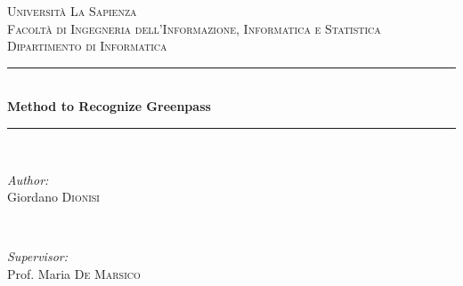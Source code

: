 \documentclass[12pt]{article}
\begin{document}
\begin{titlepage}

\newcommand{\HRule}{\rule{\linewidth}{0.5mm}} %

\center %
 

\textsc{\LARGE Università La Sapienza}\\[1.5cm] %
\textsc{\Large Facoltà di Ingegneria dell’Informazione, Informatica e Statistica}\\[0.5cm] %
\textsc{\large Dipartimento di Informatica}\\[0.5cm] %


\HRule \\[0.4cm]
{ \huge \bfseries Method to Recognize Greenpass}\\[0.4cm] %
\HRule \\[1.5cm]
 

\begin{minipage}{0.4\textwidth}
\begin{flushleft} \large
\emph{Author:}\\
Giordano \textsc{Dionisi}

\end{flushleft}
\end{minipage}
~
\begin{minipage}{0.4\textwidth}
\begin{flushright} \large
\emph{Supervisor:} \\
Prof. Maria \textsc{De Marsico} %
\end{flushright}
\end{minipage}\\[2cm]


\end{titlepage}
\end{document}
